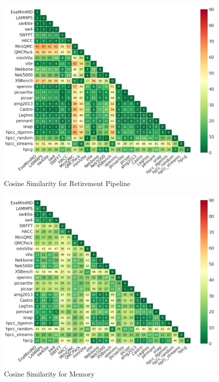 \begin{figure}[ht]
\centering
\includegraphics[width=0.9\linewidth]{figs/Retirement_Pipeline.png}
\caption{Cosine Similarity for Retirement Pipeline }
\label{figs:cosine Retirement_Pipeline}
\end{figure}

\begin{figure}[ht]
\centering
\includegraphics[width=0.9\linewidth]{figs/Memory.png}
\caption{Cosine Similarity for Memory }
\label{figs:cosine Memory}
\end{figure}

